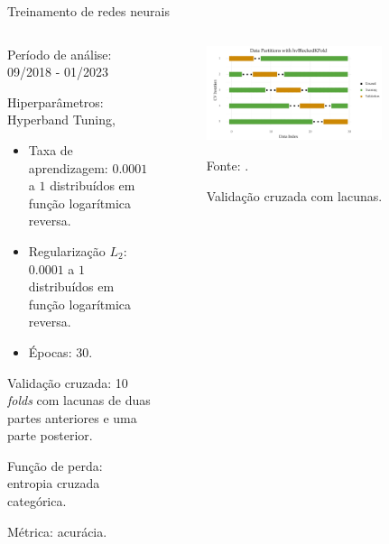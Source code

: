     \begin{frame}{Treinamento de redes neurais}


        \begin{columns}
            \begin{column}{0.5\textwidth}

                Período de análise: 09/2018 - 01/2023

                Hiperparâmetros: Hyperband Tuning,

                \begin{itemize}
                    \item Taxa de aprendizagem: $0.0001$ a $1$ distribuídos em função logarítmica reversa.
                    \item Regularização $L_{2}$: $0.0001$ a $1$ distribuídos em função logarítmica reversa.
                    \item Épocas: 30.
                \end{itemize}

                Validação cruzada: 10 \textit{folds} com lacunas de duas partes anteriores e uma parte posterior.

                
                Função de perda: entropia cruzada categórica.
                
                Métrica: acurácia.

            \end{column}

            \begin{column}{0.5\textwidth}


                \begin{figure}[htp]
                    \centering
                    \caption{Validação cruzada com lacunas.}
                    \label{fig:cross_validation}
                    \includegraphics[width=0.8\textwidth]{./images/cross_validation.png}
                    \par \footnotesize Fonte: \citeauthor{Cerqueira2023}.
                \end{figure}

            \end{column}
        \end{columns}

    \end{frame}




